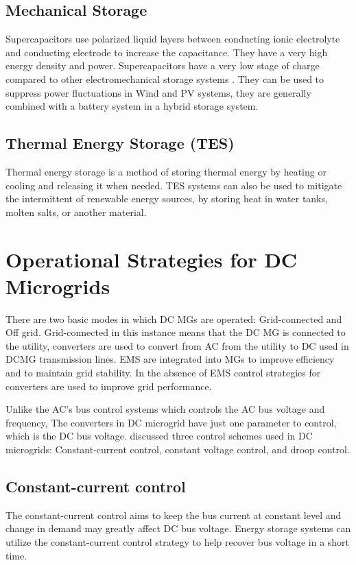 \subsection{Mechanical Storage} 
Supercapacitors use polarized liquid layers between conducting ionic electrolyte and conducting electrode to increase the capacitance. They have a very high energy density and power. Supercapacitors have a very low stage of charge compared to other electromechanical storage systems \cite{21}. They can be used to suppress power fluctuations in Wind and PV systems, they are generally combined with a battery system in a hybrid storage system.\par
\subsection{Thermal Energy Storage (TES)} 
Thermal energy storage is a method of storing thermal energy by heating or cooling and releasing it when needed. TES systems can also be used to mitigate the intermittent of renewable energy sources, by storing heat in water tanks, molten salts, or another material. \par
\section{Operational Strategies for DC Microgrids} 
There are two basic modes in which DC MGs are operated: Grid-connected and Off grid. Grid-connected in this instance means that the DC MG is connected to the utility, converters are used to convert from AC from the utility to DC used in DCMG transmission lines. EMS are integrated into MGs to improve efficiency and to maintain grid stability. In the absence of EMS control strategies for converters are used to improve grid performance.\par
Unlike the AC’s bus control systems which controls the AC bus voltage and frequency, The converters in DC microgrid have just one parameter to control, which is the DC bus voltage. \cite{22} discussed three control schemes used in DC microgrids: Constant-current control, constant voltage control, and droop control.\par
\subsection{Constant-current control} 
The constant-current control aims to keep the bus current at constant level and change in demand may greatly affect DC bus voltage. Energy storage systems can utilize the constant-current control strategy to help recover bus voltage in a short time.
